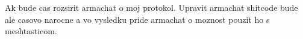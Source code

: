 \documentclass[slovak,master]{diploma}
\begin{document}
Ak bude cas rozsirit armachat o moj protokol. Upravit armachat shitcode bude ale casovo narocne a vo vysledku pride armachat o moznost pouzit ho s meshtasticom.

\printbibliography[title={Literatura}, heading=bibintoc]

%
%

%
\end{document}

